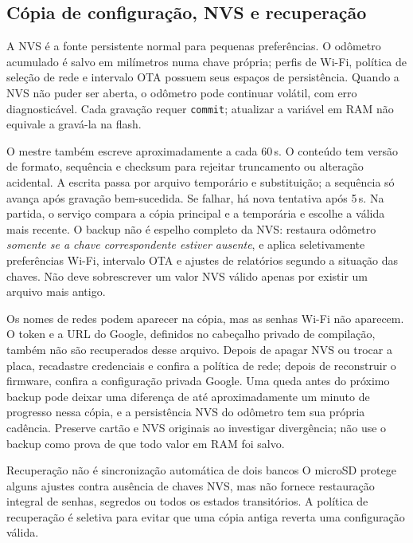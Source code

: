 \subsection{Cópia de configuração, NVS e recuperação}\label{sec:backup_config}
A NVS é a fonte persistente normal para pequenas preferências. O odômetro acumulado é salvo em milímetros numa chave própria; perfis de Wi-Fi, política de seleção de rede e intervalo OTA possuem seus espaços de persistência. Quando a NVS não puder ser aberta, o odômetro pode continuar volátil, com erro diagnosticável. Cada gravação requer \texttt{commit}; atualizar a variável em RAM não equivale a gravá-la na flash.

O mestre também escreve  aproximadamente a cada 60\,s. O conteúdo tem versão de formato, sequência e checksum para rejeitar truncamento ou alteração acidental. A escrita passa por arquivo temporário e substituição; a sequência só avança após gravação bem-sucedida. Se falhar, há nova tentativa após 5\,s. Na partida, o serviço compara a cópia principal e a temporária e escolhe a válida mais recente. O backup não é espelho completo da NVS: restaura odômetro \emph{somente se a chave correspondente estiver ausente}, e aplica seletivamente preferências Wi-Fi, intervalo OTA e ajustes de relatórios segundo a situação das chaves. Não deve sobrescrever um valor NVS válido apenas por existir um arquivo mais antigo.

Os nomes de redes podem aparecer na cópia, mas as senhas Wi-Fi não aparecem. O token e a URL do Google, definidos no cabeçalho privado de compilação, também não são recuperados desse arquivo. Depois de apagar NVS ou trocar a placa, recadastre credenciais e confira a política de rede; depois de reconstruir o firmware, confira a configuração privada Google. Uma queda antes do próximo backup pode deixar uma diferença de até aproximadamente um minuto de progresso nessa cópia, e a persistência NVS do odômetro tem sua própria cadência. Preserve cartão e NVS originais ao investigar divergência; não use o backup como prova de que todo valor em RAM foi salvo.

\begin{nota}{Recuperação não é sincronização automática de dois bancos}
O microSD protege alguns ajustes contra ausência de chaves NVS, mas não fornece restauração integral de senhas, segredos ou todos os estados transitórios. A política de recuperação é seletiva para evitar que uma cópia antiga reverta uma configuração válida.
\end{nota}

